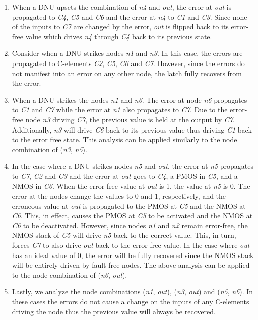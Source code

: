 \begin{enumerate}
	\item When a DNU upsets the combination of \textit{n4} and \textit{out}, the error at \textit{out} is propagated to \textit{C4}, \textit{C5} and \textit{C6} and the error at \textit{n4} to \textit{C1} and \textit{C3}. Since none of the inputs to \textit{C7} are changed by the error, \textit{out} is flipped back to its error-free value which drives \textit{n4} through \textit{C4} back to its previous state.

	\item Consider when a DNU strikes nodes \textit{n1} and \textit{n3}. In this case, the errors are propagated to C-elements \textit{C2}, \textit{C5}, \textit{C6} and \textit{C7}. However, since the errors do not manifest into an error on any other node, the latch fully recovers from the error. 
	
	\item When a DNU strikes the nodes \textit{n1} and \textit{n6}. The error at node \textit{n6} propagates to  \textit{C1} and \textit{C7} while the error at \textit{n1} also propagates to \textit{C7}. Due to the error-free node \textit{n3} driving \textit{C7}, the previous value is held at the output by \textit{C7}. Additionally, \textit{n3} will drive \textit{C6} back to its previous value thus driving \textit{C1} back to the error free state. This analysis can be applied similarly to the node combination of (\textit{n3}, \textit{n5}). 

	\item In the case where a DNU strikes nodes \textit{n5} and \textit{out}, the error at \textit{n5} propagates to \textit{C7}, \textit{C2} and \textit{C3} and the error at \textit{out} goes to \textit{C4}, a PMOS in \textit{C5}, and a NMOS in \textit{C6}. When the error-free value at \textit{out} is 1, the value at \textit{n5} is 0. The error at the nodes change the values to 0 and 1, respectively, and the erroneous value at \textit{out} is propagated to the PMOS at \textit{C5} and the NMOS at \textit{C6}. This, in effect, causes the PMOS at \textit{C5} to be activated and the NMOS at \textit{C6} to be deactivated. However, since nodes \textit{n1} and \textit{n2} remain error-free, the NMOS stack of \textit{C5} will drive \textit{n5} back to the correct value. This, in turn, forces \textit{C7} to also drive \textit{out} back to the error-free value. In the case where \textit{out} has an ideal value of 0, the error will be fully recovered since the NMOS stack will be entirely driven by fault-free nodes. The above analysis can be applied to the node combination of (\textit{n6}, \textit{out}). 
	
	\item Lastly, we analyze the node combinations (\textit{n1}, \textit{out}), (\textit{n3}, \textit{out}) and (\textit{n5}, \textit{n6}). In these cases the errors do not cause a change on the inputs of any C-elements driving the node thus the previous value will always be recovered. 
\end{enumerate}

